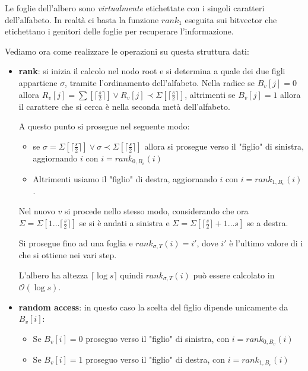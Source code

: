Le foglie dell'albero sono \textit{virtualmente} etichettate con i singoli
caratteri dell'alfabeto. In realtà ci basta la funzione $rank_1$ eseguita sui
bitvector che etichettano i genitori delle foglie per recuperare l'informazione.

Vediamo ora come realizzare le operazioni su questa struttura dati:
\begin{itemize}
    \item \textbf{rank}: si inizia il calcolo nel nodo root e si determina a
          quale dei due figli appartiene $\sigma$, tramite l'ordinamento dell'alfabeto.
          Nella radice se $B_v [j] = 0$ allora
          $R_v [j] = \sum [\lceil \frac{s}{2} \rceil] \lor R_v [j] \prec \Sigma[\lceil \frac{s}{2} \rceil]$,
          altrimenti se $B_v[j] = 1$ allora il carattere che si cerca è nella seconda metà dell'alfabeto.

          A questo punto si prosegue nel seguente modo:
          \begin{itemize}
              \item se $\sigma = \Sigma [ \lceil \frac{s}{2} \rceil] \lor \sigma \prec \Sigma [\lceil \frac{s}{2}\rceil]$
                    allora si prosegue verso il "figlio" di sinistra, aggiornando $i$
                    con $i = rank_{0,B_v}(i)$
              \item Altrimenti usiamo il "figlio" di destra, aggiornando $i$
                    con $i = rank_{1,B_v}(i)$.
          \end{itemize}
          Nel nuovo $v$ si procede nello stesso modo, considerando che ora
          $\Sigma = \Sigma [1 \dots \lceil \frac{s}{2} \rceil]$ se si è andati a
          sinistra e $\Sigma = \Sigma [\lceil \frac{s}{2} \rceil + 1 \dots s]$ se a destra.

          Si prosegue fino ad una foglia e $rank_{\sigma,T} (i) = i'$, dove $i'$
          è l'ultimo valore di i che si ottiene nei vari step.

          L'albero ha altezza $\lceil \log s\rceil$ quindi $rank_{\sigma,T} (i)$
          può essere calcolato in $\mathcal{O}(\log s)$.

    \item \textbf{random access}: in questo caso la scelta del figlio dipende
          unicamente da $B_v [i]$:
          \begin{itemize}
              \item Se $B_v [i] = 0$ proseguo verso il "figlio" di sinistra,
                    con $i = rank_{0,B_v}(i)$
              \item Se $B_v [i] = 1$ proseguo verso il "figlio" di destra,
                    con $i = rank_{1,B_v}(i)$
          \end{itemize}


\end{itemize}
